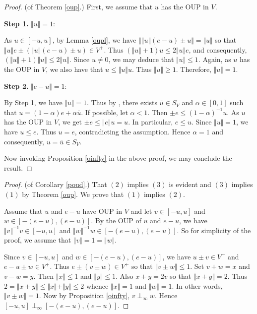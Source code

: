 \documentclass[12pt]{amsart}
\begin{document}
\begin{proof} (of Theorem \ref{oup}.) 
	First, we assume that $u$ has the OUP in $V$. 
	
	{\bf Step 1.} $\Vert u \Vert = 1$:  
	
	As $u \in [- u, u]$, by Lemma \ref{oupl}, we have $\Vert \Vert u \Vert (e - u) \pm u \Vert = \Vert u \Vert$ so that $\Vert u \Vert e \pm (\Vert u \Vert (e - u) \pm u) \in V^+$. Thus $(\Vert u \Vert + 1) u \le 2 \Vert u \Vert e$, and consequently, $(\Vert u \Vert + 1) \Vert u \Vert \le 2 \Vert u \Vert$. Since $u \ne 0$, we may deduce that $\Vert u \Vert \le 1$. Again, as $u$ has the OUP in $V$, we also have that $u \le \Vert u \Vert u$. Thus $\Vert u \Vert \ge 1$. Therefore, $\Vert u \Vert = 1$. 
	
	{\bf Step 2.} $\Vert e - u \Vert = 1$:  
	
	By Step 1, we have $\Vert u \Vert = 1$. Thus by \cite{K23}, there exists $\bar{u} \in S_V$ and $\alpha \in [0, 1]$ such that $u = (1 - \alpha) e + \alpha \bar{u}$. If possible, let $\alpha < 1$. Then $\pm e \le (1 - \alpha)^{-1} u$. As $u$ has the OUP in $V$, we get $\pm e \le \Vert e \Vert u = u$. In particular, $e \le u$. Since $\Vert u \Vert = 1$, we have $u \le e$. Thus $u = e$, contradicting the assumption. Hence $\alpha = 1$ and consequently, $u = \bar{u} \in S_V$. 
	
	Now invoking  Proposition \ref{oinfty} in the above proof, we may conclude the result. 
\end{proof} 
\begin{proof} (of Corollary \ref{poud}.) 
	That $(2)$ implies $(3)$ is evident and $(3)$ implies $(1)$ by Theorem \ref{oup}. We prove that $(1)$ implies $(2)$. 
	
	Assume that $u$ and $e - u$ have OUP in $V$ and let $v \in [- u, u]$ and $w \in [- (e - u), (e - u)]$. By the OUP of $u$ and $e - u$, we have $\Vert v \Vert^{-1} v \in [- u, u]$ and $\Vert w \Vert^{-1} w \in [- (e - u), (e - u)]$. So for simplicity of the proof, we assume that $\Vert v \Vert = 1 = \Vert w \Vert$. 
	
	Since $v \in [- u, u]$ and $w \in [- (e - u), (e - u)]$, we have $u \pm v \in V^+$ and $e - u \pm w \in V^+$. Thus $e \pm (v \pm w) \in V^+$ so that $\Vert v \pm w \Vert \le 1$. Set $v + w = x$ and $v - w = y$. Then $\Vert x \Vert \le 1$ and $\Vert y \Vert \le 1$. Also $x + y = 2 v$ so that $\Vert x + y \Vert = 2$. Thus $2 = \Vert x + y \Vert \le \Vert x \Vert + \Vert y \Vert \le 2$ whence $\Vert x \Vert = 1$ and $\Vert w \Vert = 1$. In other words, $\Vert v \pm w \Vert = 1$. Now by Proposition \ref{oinfty}, $v \perp_{\infty} w$. Hence $[- u, u] \perp_{\infty} [- (e - u), (e - u)]$. 
\end{proof} 
\end{document}
